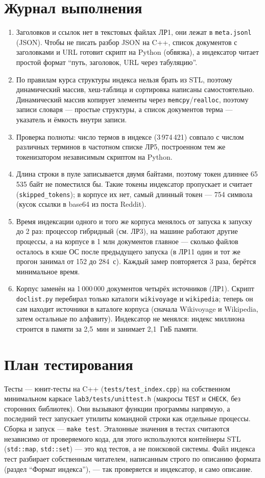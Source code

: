 \section{Журнал выполнения}
\begin{enumerate}
    \item Заголовков и ссылок нет в текстовых файлах ЛР1, они лежат в \texttt{meta.jsonl} (JSON). Чтобы не писать разбор JSON на C++, список документов с заголовками и URL готовит скрипт на Python (обвязка), а индексатор читает простой формат \enquote{путь, заголовок, URL через табуляцию}.
    \item По правилам курса структуры индекса нельзя брать из STL, поэтому динамический массив, хеш-таблица и сортировка написаны самостоятельно. Динамический массив копирует элементы через \texttt{memcpy}/\texttt{realloc}, поэтому записи словаря --- простые структуры, а список документов терма --- указатель и ёмкость внутри записи.
    \item Проверка полноты: число термов в индексе (3\,974\,421) совпало с числом различных терминов в частотном списке ЛР5, построенном тем же токенизатором независимым скриптом на Python.
    \item Длина строки в пуле записывается двумя байтами, поэтому токен длиннее 65\,535 байт не поместился бы. Такие токены индексатор пропускает и считает (\texttt{skipped\_tokens}); в корпусе их нет, самый длинный токен --- 754 символа (кусок ссылки в base64 из поста Reddit).
    \item Время индексации одного и того же корпуса менялось от запуска к запуску до 2 раз: процессор гибридный (см. ЛР3), на машине работают другие процессы, а на корпусе в 1 млн документов главное --- сколько файлов осталось в кэше ОС после предыдущего запуска (в ЛР11 один и тот же прогон занимал от 152 до 284~с). Каждый замер повторяется 3 раза, берётся минимальное время.
    \item Корпус заменён на 1\,000\,000 документов четырёх источников (ЛР1). Скрипт \texttt{doclist.py} перебирал только каталоги \texttt{wikivoyage} и \texttt{wikipedia}; теперь он сам находит источники в каталоге корпуса (сначала Wikivoyage и Wikipedia, затем остальные по алфавиту). Индексатор не менялся: индекс миллиона строится в памяти за 2,5~мин и занимает 2,1~ГиБ памяти.
\end{enumerate}

\section{План тестирования}
Тесты --- юнит-тесты на C++ (\texttt{tests/test\_index.cpp}) на собственном минимальном каркасе \texttt{lab3/tests/unittest.h} (макросы \texttt{TEST} и \texttt{CHECK}, без сторонних библиотек). Они вызывают функции программы напрямую, а последний тест запускает утилиты командной строки как отдельные процессы. Сборка и запуск --- \texttt{make test}. Эталонные значения в тестах считаются независимо от проверяемого кода, для этого используются контейнеры STL (\texttt{std::map}, \texttt{std::set}) --- это код тестов, а не поисковой системы. Файл индекса тест разбирает собственным читателем, написанным строго по описанию формата (раздел \enquote{Формат индекса}), --- так проверяется и индексатор, и само описание.

